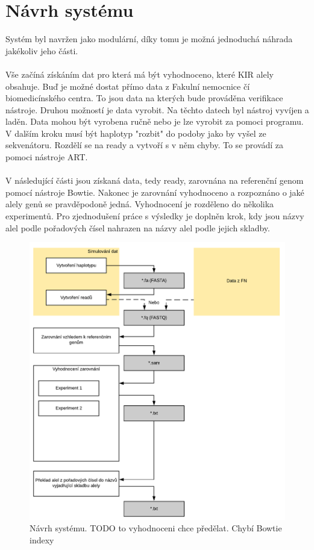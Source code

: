 \documentclass[czech,DP]{thesiskiv}
\numberwithin{equation}{section}
\begin{document}
\section{Návrh systému}
Systém byl navržen jako modulární, díky tomu je možná jednoduchá náhrada jakékoliv jeho části. 
\\
\\ 
Vše začíná získáním dat pro která má být vyhodnoceno, které KIR alely obsahuje. Buď je možné dostat přímo data z Fakulní nemocnice čí biomedicínského centra. To jsou data na kterých bude prováděna verifikace nástroje. Druhou možností je data vyrobit. Na těchto datech byl nástroj vyvíjen a laděn. Data mohou být vyrobena ručně nebo je lze vyrobit za pomoci programu. V dalším kroku musí být haplotyp "rozbit" do podoby jako by vyšel ze sekvenátoru. Rozdělí se na ready a vytvoří s v něm chyby. To se provádí za pomoci nástroje ART.
\\
\\
V následující části jsou získaná data, tedy ready, zarovnána na referenční genom pomocí nástroje Bowtie. Nakonec je zarovnání vyhodnoceno a rozpoznáno o jaké alely genů se pravděpodoně jedná. Vyhodnocení je rozděleno do několika experimentů. Pro zjednodušení práce s výsledky je doplněn krok, kdy jsou názvy alel podle pořadových čísel nahrazen na názvy alel podle jejich skladby.

\begin{figure}[H]
		\centering
		\includegraphics[width=\textwidth]{./img/navrh_systemu.pdf}
		\caption{Návrh systému. TODO to vyhodnoceni chce předělat. Chybí Bowtie indexy }
		\label{fig:navrh_systemu}
\end{figure}
\end{document}
